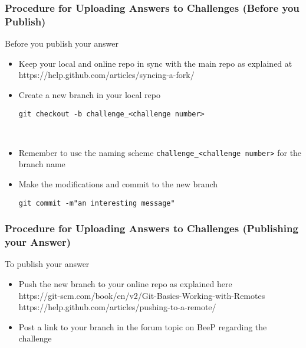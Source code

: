 \documentclass[smaller,a4paper,allowframebreaks]{beamer}
\begin{document}
\begin{frame}\frametitle{Procedure for Uploading Answers to Challenges (Before you Publish)}
Before you publish your answer\\[3mm]
\begin{itemize}
\item Keep your local and online repo in sync with the main repo as explained at\\[3mm]
https://help.github.com/articles/syncing-a-fork/\\[3mm]
\item Create a new branch in your local repo \\[3mm]
\begin{lstlisting}
git checkout -b challenge_<challenge number>
\end{lstlisting}
~\\[3mm]
\item Remember to use the naming scheme \lstinline{challenge_<challenge number>}
for the branch name\\[3mm]
\item Make the modifications and commit to the new branch\\[3mm]
\begin{lstlisting}
git commit -m"an interesting message"
\end{lstlisting}
\end{itemize}
\end{frame}

\begin{frame}\frametitle{Procedure for Uploading Answers to Challenges (Publishing your Answer)}
To publish your answer\\[3mm]
\begin{itemize}
\item Push the new branch to your online repo as explained here\\[3mm]
https://git-scm.com/book/en/v2/Git-Basics-Working-with-Remotes\\
https://help.github.com/articles/pushing-to-a-remote/
\item Post a link to your branch in the forum topic on BeeP regarding the challenge
\end{itemize}
\end{frame}
\end{document}
